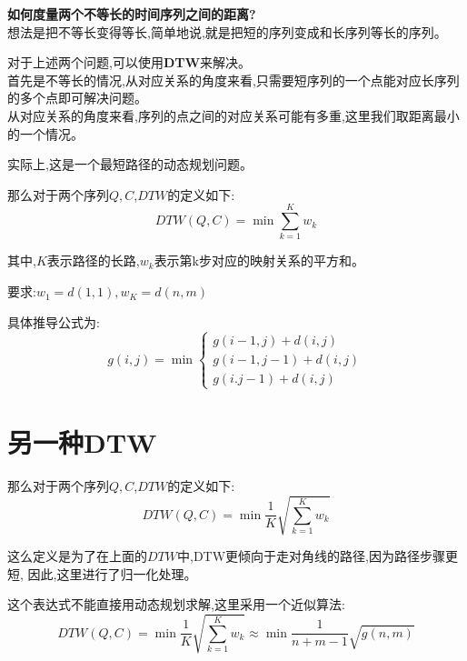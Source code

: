 \documentclass[UTF8,a4paper]{ctexart}
\newcommand{\spaceline}{\vspace{\baselineskip}}
\begin{document}
  \spaceline

  \textbf{如何度量两个不等长的时间序列之间的距离?}\\
  想法是把不等长变得等长,简单地说,就是把短的序列变成和长序列等长的序列。

  \spaceline

  对于上述两个问题,可以使用\textbf{DTW}来解决。\\
  首先是不等长的情况,从对应关系的角度来看,只需要短序列的一个点能对应长序列的多个点即可解决问题。\\
  从对应关系的角度来看,序列的点之间的对应关系可能有多重,这里我们取距离最小的一个情况。

  \spaceline

  实际上,这是一个最短路径的动态规划问题。

  那么对于两个序列$Q,C$,$DTW$的定义如下:
  \begin{equation}
    DTW(Q,C) = \min \sum_{k = 1}^{K} w_k
  \end{equation}

  其中,$K$表示路径的长路,$w_k$表示第k步对应的映射关系的平方和。

  要求:$w_1 = d(1,1) , w_K = d(n,m)$

  具体推导公式为:
  \begin{equation}
    g(i,j) = \min  \left \{
    \begin{array}{l}
      g(i - 1,j) + d(i,j)\\
      g(i - 1, j - 1) + d(i , j)\\
      g(i.j - 1) + d(i , j)
    \end{array}
    \right .
  \end{equation}

  \section{另一种DTW}
  那么对于两个序列$Q,C$,$DTW$的定义如下:
  \begin{equation}
    DTW(Q,C) = \min \frac{1}{K} \sqrt{ \sum_{k = 1}^{K} w_k}
  \end{equation}

  这么定义是为了在上面的$DTW$中,DTW更倾向于走对角线的路径,因为路径步骤更短,
  因此,这里进行了归一化处理。

  这个表达式不能直接用动态规划求解,这里采用一个近似算法:
  \begin{equation}
    DTW(Q,C) = \min \frac{1}{K} \sqrt{ \sum_{k = 1}^{K} w_k}\approx \min \frac{1}{n+m-1} \sqrt{ g(n,m)}
  \end{equation}
\end{document}
